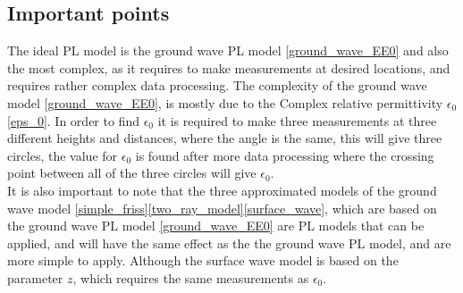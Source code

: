 \subsection{Important points}
The ideal PL model is the ground wave PL model \eqref{ground_wave_EE0} and also the most complex, as it requires to make measurements at desired locations, and requires rather complex data processing. The complexity of the ground wave model \eqref{ground_wave_EE0}, is mostly due to the Complex relative permittivity $\epsilon_{0}$ \eqref{eps_0}. In order to find $\epsilon_{0}$ it is required to make three measurements at three different heights and distances, where the angle is the same, this will give three circles, the value for $\epsilon_{0}$ is found after more data processing where the crossing point between all of the three circles will give $\epsilon_{0}$.  \\

It is also important to note that the three approximated models of the ground wave model \eqref{simple_friss}\eqref{two_ray_model}\eqref{surface_wave}, which are based on the ground wave PL model \eqref{ground_wave_EE0} are PL models that can be applied, and will have the same effect as the the ground wave PL model, and are more simple to apply. Although the surface wave model is based on the parameter $z$, which requires the same measurements as $\epsilon_{0}$.
